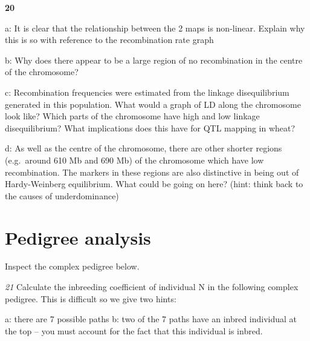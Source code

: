 \documentclass[
]{book}
\makeatletter
\newenvironment{kframe}{%
\medskip{}
\setlength{\fboxsep}{.8em}
 \def\at@end@of@kframe{}%
 \ifinner\ifhmode%
  \def\at@end@of@kframe{\end{minipage}}%
  \begin{minipage}{\columnwidth}%
 \fi\fi%
 \def\FrameCommand##1{\hskip\@totalleftmargin \hskip-\fboxsep
 \colorbox{shadecolor}{##1}\hskip-\fboxsep
     \hskip-\linewidth \hskip-\@totalleftmargin \hskip\columnwidth}%
 \MakeFramed {\advance\hsize-\width
   \@totalleftmargin\z@ \linewidth\hsize
   \@setminipage}}%
 {\par\unskip\endMakeFramed%
 \at@end@of@kframe}
\newenvironment{rmdblock}[1]
  {
  \begin{itemize}
  \renewcommand{\labelitemi}{
    \raisebox{-.7\height}[0pt][0pt]{
      {\setkeys{Gin}{width=3em,keepaspectratio}\texttt{[image: images/\#1]}}
    }
  }
  \setlength{\fboxsep}{1em}
  \begin{kframe}
  \item
  }
  {
  \end{kframe}
  \end{itemize}
  }
\newenvironment{rmdquiz}
  {\begin{rmdblock}{quiz}}
  {\end{rmdblock}}
\makeatother
\begin{document}
\begin{rmdquiz}
\textbf{20}

a: It is clear that the relationship between the 2 maps is non-linear. Explain why this is so with reference to the recombination rate graph

b: Why does there appear to be a large region of no recombination in the centre of the chromosome?

c: Recombination frequencies were estimated from the linkage disequilibrium generated in this population. What would a graph of LD along the chromosome look like? Which parts of the chromosome have high and low linkage disequilibrium? What implications does this have for QTL mapping in wheat?

d: As well as the centre of the chromosome, there are other shorter regions (e.g.~around 610 Mb and 690 Mb) of the chromosome which have low recombination. The markers in these regions are also distinctive in being out of Hardy-Weinberg equilibrium. What could be going on here? (hint: think back to the causes of underdominance)
\end{rmdquiz}

\hypertarget{pedigree-analysis}{%
\section{Pedigree analysis}\label{pedigree-analysis}}

Inspect the complex pedigree below.

\begin{rmdquiz}
\emph{21} Calculate the inbreeding coefficient of individual N in the following complex pedigree. This is difficult so we give two hints:

a: there are 7 possible paths
b: two of the 7 paths have an inbred individual at the top -- you must account for the fact that this individual is inbred.
\end{rmdquiz}
\end{document}
